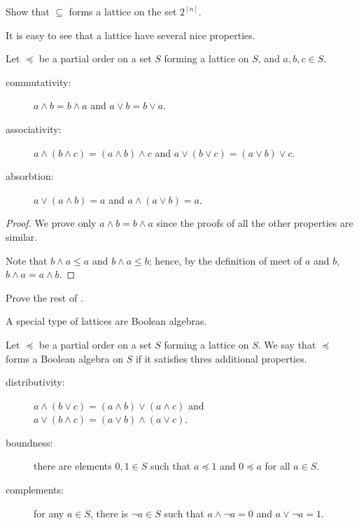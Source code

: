 \begin{exercise}
\label{exercise:set-lattice}
  Show that $\subseteq$ forms a lattice on the set $2^{[n]}$.
\end{exercise}

It is easy to see that a lattice have several nice properties.
\begin{theorem}
\label{theorem:lattice-properties}
  Let $\preceq$ be a partial order on a set $S$ forming a lattice on $S$,
  and $a, b, c \in S$.
  \begin{description}
    \item[commutativity:] $a \land b = b \land a$ and $a \lor b = b \lor a$.
    \item[associativity:] $a \land (b \land c) = (a \land b) \land c$ and
      $a \lor (b \lor c) = (a \lor b) \lor c$.
    \item[absorbtion:] $a \lor (a \land b) = a$ and $a \land (a \lor b) = a$.
  \end{description}
\end{theorem}
\begin{proof}
  We prove only $a \land b = b \land a$ since the proofs of all the other
  properties are similar.

  Note that $b \land a \le a$ and $b \land a \le b$; hence, by the definition of
  meet of $a$ and $b$, $b \land a = a \land b$.
\end{proof}

\begin{exercise}
  Prove the rest of .
\end{exercise}

A special type of lattices are Boolean algebras.
\begin{definition}
  Let $\preceq$ be a partial order on a set $S$ forming a lattice on $S$.
  We say that $\preceq$ forms a Boolean algebra on $S$ if it satisfies
  thres additional properties.
  \begin{description}
    \item[distributivity:] $a \land (b \lor c) = (a \land b) \lor (a \land c)$
      and $a \lor (b \land c) = (a \lor b) \land (a \lor c)$.
    \item[boundness:] there are elements $0, 1 \in S$ such that $a \preceq 1$
      and $0 \preceq a$ for all $a \in S$.
    \item[complements:] for any $a \in S$, there is $\lnot a \in S$ such that
      $a \land \lnot a = 0$ and $a \lor \lnot a = 1$.
  \end{description}
\end{definition}

